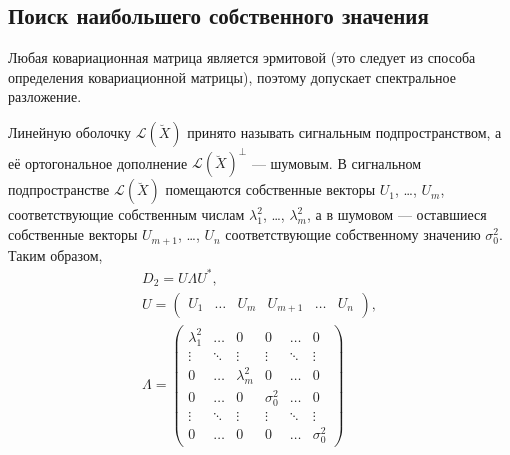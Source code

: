 \documentclass[a4paper,12pt]{article}
\newcommand{\linear}[1]{\mathcal{L} \left ( #1 \right )}
\begin{document}
    \subsection{Поиск наибольшего собственного значения}

    Любая ковариационная матрица является эрмитовой (это следует из способа определения ковариационной матрицы), поэтому допускает спектральное разложение.

    Линейную оболочку $\linear{\breve{X}}$ принято называть сигнальным подпространством, а её ортогональное дополнение $\linear{\breve{X}}^\perp$ --- шумовым. В сигнальном
    подпространстве $\linear{\breve{X}}$ помещаются собственные векторы $U_1$, \dots, $U_m$, соответствующие собственным числам $\lambda_1^2$, \dots, $\lambda_m^2$, а в шумовом ---
    оставшиеся собственные векторы $U_{m+1}$, \dots, $U_n$ соответствующие собственному значению $\sigma_0^2$. Таким образом,
    \begin{gather*}
        D_2 = U \Lambda U^* , \\
        U
        = \begin{pmatrix}
              U_1 & \dots & U_m & U_{m+1} & \dots & U_n
        \end{pmatrix}, \\
        \Lambda
        = \begin{pmatrix}
              \lambda_1^2 & \dots  & 0           & 0          & \dots  & 0          \\
              \vdots      & \ddots & \vdots      & \vdots     & \ddots & \vdots     \\
              0           & \dots  & \lambda_m^2 & 0          & \dots  & 0          \\
              0           & \dots  & 0           & \sigma_0^2 & \dots  & 0          \\
              \vdots      & \ddots & \vdots      & \vdots     & \ddots & \vdots     \\
              0           & \dots  & 0           & 0          & \dots  & \sigma_0^2
        \end{pmatrix}
    \end{gather*}
\end{document}
